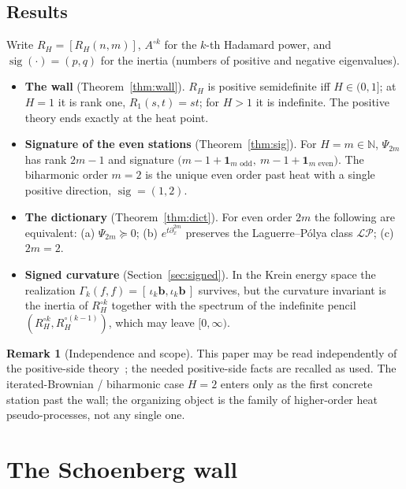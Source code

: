 \documentclass[11pt,reqno]{amsart}
\theoremstyle{plain}
\theoremstyle{definition}
\newtheorem{remark}[theorem]{Remark}
\newcommand{\N}{\mathbb{N}}
\newcommand{\Had}{\mathbin{\circ}}
\newcommand{\LP}{\mathcal{LP}}
\newcommand{\Gam}{\Gamma}
\DeclareMathOperator{\sig}{sig}
\begin{document}
\subsection*{Results}
Write $R_H=[R_H(n,m)]$, $A^{\Had k}$ for the $k$-th Hadamard power, and
$\sig(\cdot)=(p,q)$ for the inertia (numbers of positive and negative eigenvalues).

\begin{itemize}[leftmargin=1.5em]
\item \textbf{The wall} (Theorem~\ref{thm:wall}). $R_H$ is positive semidefinite
  iff $H\in(0,1]$; at $H=1$ it is rank one, $R_1(s,t)=st$; for $H>1$ it is
  indefinite. The positive theory ends exactly at the heat point.
\item \textbf{Signature of the even stations} (Theorem~\ref{thm:sig}). For
  $H=m\in\N$, $\Psi_{2m}$ has rank $2m-1$ and signature
  $\bigl(m-1+\mathbf 1_{m\text{ odd}},\ m-1+\mathbf 1_{m\text{ even}}\bigr)$. The
  biharmonic order $m=2$ is the unique even order past heat with a single positive
  direction, $\sig=(1,2)$.
\item \textbf{The dictionary} (Theorem~\ref{thm:dict}). For even order $2m$ the
  following are equivalent: (a) $\Psi_{2m}\succeq0$; (b) $e^{t\partial_x^{2m}}$
  preserves the Laguerre--P\'olya class $\LP$; (c) $2m=2$.
\item \textbf{Signed curvature} (Section~\ref{sec:signed}). In the Krein energy
  space the realization $\Gam_k(f,f)=[\,\iota_k\mathbf b,\iota_k\mathbf b\,]$
  survives, but the curvature invariant is the inertia of $R_H^{\Had k}$ together
  with the spectrum of the indefinite pencil $(R_H^{\Had k},R_H^{\Had(k-1)})$,
  which may leave $[0,\infty)$.
\end{itemize}

\begin{remark}[Independence and scope]\label{rem:indep}
This paper may be read independently of the positive-side theory~\cite{FontesPartI};
the needed positive-side facts are recalled as used. The iterated-Brownian / biharmonic case
$H=2$ enters only as the first concrete station past the wall; the organizing
object is the family of higher-order heat pseudo-processes, not any single one.
\end{remark}

\section{The Schoenberg wall}\label{sec:wall}
\end{document}
